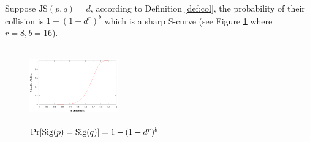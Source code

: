 Suppose $\text{JS}(p,q)=d$, according to Definition \ref{def:col}, the probability of their
collision is $1-(1-d^r)^b$ which is a sharp S-curve (see Figure
        \ref{fig:scurve} where $r=8, b=16$). 
\begin{figure}
\centering
\includegraphics[width=1.5in, height=1.3in]{figures/scurve.eps}
\caption{$\Pr[\textnormal{Sig}(p)=\textnormal{Sig}(q)]=1-(1-d^r)^b$}
\label{fig:scurve}
\end{figure}



